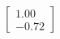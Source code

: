 \documentclass[preview]{standalone}
\begin{document}
\begin{align*}
\begin{bmatrix} 1.00 \\ -0.72 \end{bmatrix}
\end{align*}
\end{document}

